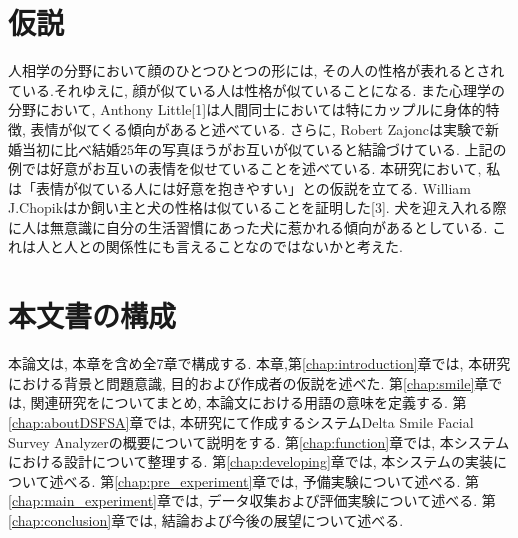 
\section{仮説}
人相学の分野において顔のひとつひとつの形には, その人の性格が表れるとされている.それゆえに, 顔が似ている人は性格が似ていることになる.
また心理学の分野において, Anthony Little[1]は人間同士においては特にカップルに身体的特徴, 表情が似てくる傾向があると述べている.\cite{AnthonyLittle}
さらに, Robert Zajoncは実験で新婚当初に比べ結婚25年の写真ほうがお互いが似ていると結論づけている.\cite{RobertZajonc}
上記の例では好意がお互いの表情を似せていることを述べている.
本研究において, 私は「表情が似ている人には好意を抱きやすい」との仮説を立てる.
William J.Chopikはか飼い主と犬の性格は似ていることを証明した[3]. 犬を迎え入れる際に人は無意識に自分の生活習慣にあった犬に惹かれる傾向があるとしている.
これは人と人との関係性にも言えることなのではないかと考えた.



\section{本文書の構成}

本論文は, 本章を含め全7章で構成する. 本章,第\ref{chap:introduction}章では, 本研究における背景と問題意識, 目的および作成者の仮説を述べた.
第\ref{chap:smile}章では, 関連研究をについてまとめ, 本論文における用語の意味を定義する.
第\ref{chap:aboutDSFSA}章では, 本研究にて作成するシステムDelta Smile Facial Survey Analyzerの概要について説明をする.
第\ref{chap:function}章では, 本システムにおける設計について整理する.
第\ref{chap:developing}章では, 本システムの実装について述べる.
第\ref{chap:pre_experiment}章では, 予備実験について述べる.
第\ref{chap:main_experiment}章では, データ収集および評価実験について述べる.
第\ref{chap:conclusion}章では, 結論および今後の展望について述べる.
